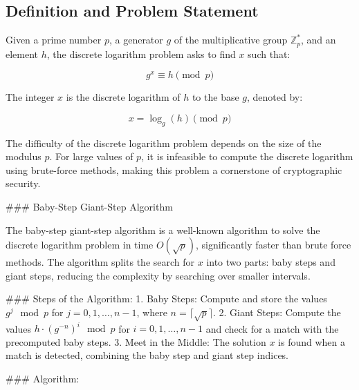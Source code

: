 \documentclass[10pt,a4paper]{article}
\begin{document}
\subsection*{Definition and Problem Statement}

Given a prime number \(p\), a generator \(g\) of the multiplicative group \( \mathbb{Z}_p^* \), and an element \(h\), the discrete logarithm problem asks to find \(x\) such that:

\[
g^x \equiv h \pmod{p}
\]

The integer \(x\) is the discrete logarithm of \(h\) to the base \(g\), denoted by:

\[
x = \log_g(h) \pmod{p}
\]

The difficulty of the discrete logarithm problem depends on the size of the modulus \(p\). For large values of \(p\), it is infeasible to compute the discrete logarithm using brute-force methods, making this problem a cornerstone of cryptographic security.

### Baby-Step Giant-Step Algorithm

The baby-step giant-step algorithm is a well-known algorithm to solve the discrete logarithm problem in time \(O(\sqrt{p})\), significantly faster than brute force methods. The algorithm splits the search for \(x\) into two parts: baby steps and giant steps, reducing the complexity by searching over smaller intervals.

### Steps of the Algorithm:
1. Baby Steps: Compute and store the values \(g^j \mod p\) for \(j = 0, 1, \dots, n-1\), where \(n = \lceil \sqrt{p} \rceil\).
2. Giant Steps: Compute the values \(h \cdot (g^{-n})^i \mod p\) for \(i = 0, 1, \dots, n-1\) and check for a match with the precomputed baby steps.
3. Meet in the Middle: The solution \(x\) is found when a match is detected, combining the baby step and giant step indices.

### Algorithm:
\end{document}
